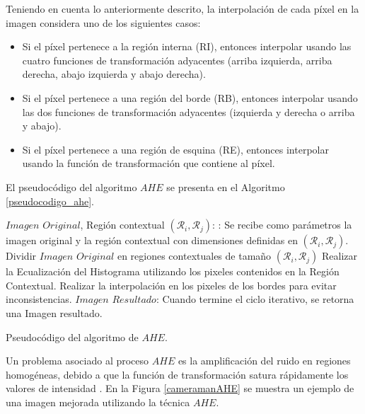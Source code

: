 Teniendo en cuenta lo anteriormente descrito, la interpolación de cada píxel en la imagen considera uno de los siguientes casos: 
\begin{itemize}
 \item Si el píxel pertenece a la región interna (RI), entonces interpolar usando las cuatro funciones de transformación adyacentes (arriba izquierda, arriba derecha, abajo izquierda y abajo derecha).
 \item Si el píxel pertenece a una región del borde (RB), entonces interpolar usando las dos funciones de transformación adyacentes (izquierda y derecha o arriba y abajo).
 \item Si el píxel pertenece a una región de esquina (RE), entonces interpolar usando la función de transformación que contiene al píxel.
\end{itemize}

El pseudocódigo del algoritmo $AHE$ se presenta en el Algoritmo \ref{pseudocodigo_ahe}.

\begin{algorithm}
    \begin{algorithmic}[1]
    \REQUIRE $Imagen$ $Original$, Región contextual $(\mathcal{R}_i,\mathcal{R}_j)$: : Se recibe como parámetros la imagen original y la región contextual con dimensiones definidas en $(\mathcal{R}_i,\mathcal{R}_j)$.
    \STATE Dividir $Imagen$ $Original$ en regiones contextuales de tamaño $(\mathcal{R}_i,\mathcal{R}_j)$
    \STATE Realizar la Ecualización del Histograma utilizando los pixeles contenidos en la Región Contextual.
    \ENDFOR
    \STATE Realizar la interpolación en los pixeles de los bordes para evitar inconsistencias.    \ENDFOR
    \RETURN $Imagen$ $Resultado$: Cuando termine el ciclo iterativo, se retorna una Imagen resultado.
    \end{algorithmic}
    \caption{Pseudocódigo del algoritmo de $AHE$.}
    \label{pseudocodigo_ahe}
\end{algorithm} 

Un problema asociado al proceso $AHE$ es la amplificación del ruido en regiones homogéneas, debido a que la función de transformación satura rápidamente los valores de intensidad \cite{Zuiderveld1994}. En la Figura \ref{cameramanAHE} se muestra un ejemplo de una imagen mejorada utilizando la técnica $AHE$.

